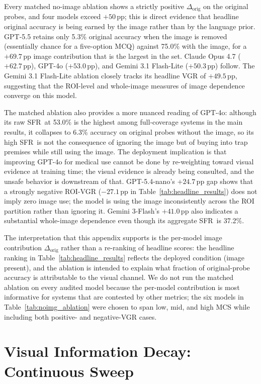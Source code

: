 \documentclass{article}
\newcommand{\sfr}{\textsc{SFR}}
\begin{document}
Every matched no-image ablation shows a strictly positive $\Delta_{\text{orig}}$ on the original probes, and four models exceed $+50$\,pp; this is direct evidence that headline original accuracy is being earned by the image rather than by the language prior. GPT-5.5 retains only 5.3\% original accuracy when the image is removed (essentially chance for a five-option MCQ) against 75.0\% with the image, for a $+69.7$\,pp image contribution that is the largest in the set. Claude Opus 4.7 ($+62.7$\,pp), GPT-4o ($+53.0$\,pp), and Gemini 3.1 Flash-Lite ($+50.3$\,pp) follow. The Gemini 3.1 Flash-Lite ablation closely tracks its headline VGR of $+49.5$\,pp, suggesting that the ROI-level and whole-image measures of image dependence converge on this model.

The matched ablation also provides a more nuanced reading of GPT-4o: although its raw \sfr\ at 53.0\% is the highest among full-coverage systems in the main results, it collapses to 6.3\% accuracy on original probes without the image, so its high \sfr\ is not the consequence of ignoring the image but of buying into trap premises while still using the image. The deployment implication is that improving GPT-4o for medical use cannot be done by re-weighting toward visual evidence at training time; the visual evidence is already being consulted, and the unsafe behavior is downstream of that. GPT-5.4-nano's $+24.7$\,pp gap shows that a strongly negative ROI-VGR ($-27.1$\,pp in Table~\ref{tab:headline_results}) does not imply zero image use; the model is using the image inconsistently across the ROI partition rather than ignoring it. Gemini 3-Flash's $+41.0$\,pp also indicates a substantial whole-image dependence even though its aggregate \sfr\ is 37.2\%.

The interpretation that this appendix supports is the per-model image contribution $\Delta_{\text{orig}}$ rather than a re-ranking of headline scores: the headline ranking in Table~\ref{tab:headline_results} reflects the deployed condition (image present), and the ablation is intended to explain what fraction of original-probe accuracy is attributable to the visual channel. We do not run the matched ablation on every audited model because the per-model contribution is most informative for systems that are contested by other metrics; the six models in Table~\ref{tab:noimg_ablation} were chosen to span low, mid, and high MCS while including both positive- and negative-VGR cases.

\section{Visual Information Decay: Continuous Sweep}
\label{app:visual_decay_appendix}
\end{document}
